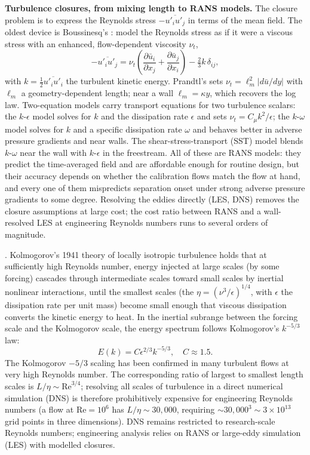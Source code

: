 \begin{mastery}
\textbf{Turbulence closures, from mixing length to RANS models.}
The closure problem is to express the Reynolds stress
$-\overline{u'_i u'_j}$ in terms of the mean field. The oldest
device is Boussinesq's : model
the Reynolds stress as if it were a viscous stress with an enhanced,
flow-dependent viscosity $\nu_t$,
\[
-\overline{u'_i u'_j} = \nu_t\!\left(\frac{\partial\bar u_i}{
\partial x_j} + \frac{\partial\bar u_j}{\partial x_i}\right)
- \tfrac{2}{3}k\,\delta_{ij},
\]
with $k = \tfrac12\overline{u'_i u'_i}$ the turbulent kinetic
energy. Prandtl's  sets $\nu_t = \ell_m^2
|d\bar u/dy|$ with $\ell_m$ a geometry-dependent length; near a
wall $\ell_m = \kappa y$, which recovers the log law. Two-equation
models carry transport equations for two turbulence scalars: the
$k$-$\epsilon$ model solves for $k$ and the dissipation rate
$\epsilon$ and sets $\nu_t = C_\mu k^2/\epsilon$; the $k$-$\omega$
model solves for $k$ and a specific dissipation rate $\omega$ and
behaves better in adverse pressure gradients and near walls. The
shear-stress-transport (SST) model blends $k$-$\omega$ near the wall
with $k$-$\epsilon$ in the freestream. All of these are RANS models:
they predict the time-averaged field and are affordable enough for
routine design, but their accuracy depends on whether the calibration
flows match the flow at hand, and every one of them mispredicts
separation onset under strong adverse pressure gradients to some
degree. Resolving the eddies directly (LES, DNS) removes the closure
assumptions at large cost; the cost ratio between RANS and a
wall-resolved LES at engineering Reynolds numbers runs to several
orders of magnitude.
\end{mastery}

. Kolmogorov's 1941 theory of locally
isotropic turbulence holds that at sufficiently high Reynolds
number, energy injected at large scales (by some forcing) cascades
through intermediate scales toward small scales by inertial
nonlinear interactions, until the smallest scales (the
 $\eta = (\nu^3/\epsilon)^{1/4}$, with
$\epsilon$ the dissipation rate per unit mass) become small
enough that viscous dissipation converts the kinetic energy to
heat. In the inertial subrange between the forcing scale and the
Kolmogorov scale, the energy spectrum follows Kolmogorov's
$k^{-5/3}$ law:
\[
E(k) = C\epsilon^{2/3}k^{-5/3}, \quad C \approx 1.5.
\]
The Kolmogorov $-5/3$ scaling has been confirmed in many
turbulent flows at very high Reynolds number. The corresponding
ratio of largest to smallest length scales is $L/\eta \sim
\text{Re}^{3/4}$; resolving all scales of turbulence in a direct
numerical simulation (DNS) is therefore prohibitively expensive
for engineering Reynolds numbers (a flow at $\text{Re} = 10^6$
has $L/\eta \sim 30{,}000$, requiring $\sim 30{,}000^3 \sim
3\times 10^{13}$ grid points in three dimensions). DNS remains
restricted to research-scale Reynolds numbers; engineering
analysis relies on RANS or large-eddy simulation (LES) with
modelled closures.

